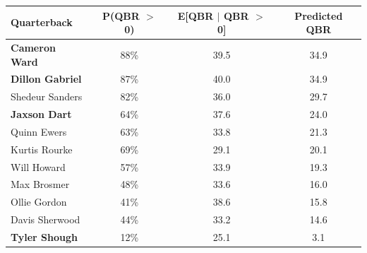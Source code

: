 \begin{tabular}{l|cc|c}
Quarterback & P(QBR $>$ 0) & E[QBR $|$ QBR $>$ 0] & Predicted QBR \\
  \hline
\textbf{Cameron Ward} & 88\% & 39.5 & 34.9 \\ 
  \textbf{Dillon Gabriel} & 87\% & 40.0 & 34.9 \\ 
  Shedeur Sanders & 82\% & 36.0 & 29.7 \\ 
  \textbf{Jaxson Dart} & 64\% & 37.6 & 24.0 \\ 
  Quinn Ewers & 63\% & 33.8 & 21.3 \\ 
  Kurtis Rourke & 69\% & 29.1 & 20.1 \\ 
  Will Howard & 57\% & 33.9 & 19.3 \\ 
  Max Brosmer & 48\% & 33.6 & 16.0 \\ 
  Ollie Gordon & 41\% & 38.6 & 15.8 \\ 
  Davis Sherwood & 44\% & 33.2 & 14.6 \\ 
   \hline
\textbf{Tyler Shough} & 12\% & 25.1 & 3.1 \\ 
\end{tabular}
